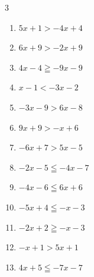 \begin{multicols}{3}
\begin{enumerate}

  \item $5x+1>-4x+4$


  \item $6x+9>-2x+9$

        \phantom{$\displaystyle x>0$}

  \item $4x-4\geqq -9x-9$


  \item $x-1<-3x-2$


  \item $-3x-9>6x-8$


\columnbreak %

\resetques

  \item $9x+9>-x+6$


  \item $-6x+7>5x-5$


  \item $-2x-5\leqq -4x-7$

        \phantom{$\displaystyle x\leqq -1$}

  \item $-4x-6\leqq 6x+6$


  \item $-5x+4\leqq -x-3$


  \item $-2x+2\geqq -x-3$

        \phantom{$\displaystyle x\leqq 5$}

  \item $-x+1>5x+1$

        \phantom{$\displaystyle x<0$}

  \item $4x+5\leqq -7x-7$


\end{enumerate}
\end{multicols}
